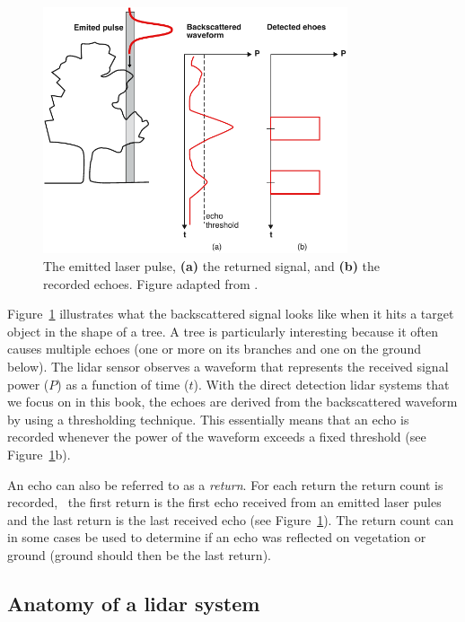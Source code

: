 \begin{figure}
	\centering
	\includegraphics[width=0.8\textwidth]{figs/lidar-multipulse.pdf}
	\caption{The emitted laser pulse, \textbf{(a)} the returned signal, and \textbf{(b)} the recorded echoes. Figure adapted from \citet{Bailly12}.}%
\label{fig:lidar-multipulse}
\end{figure}
Figure~\ref{fig:lidar-multipulse} illustrates what the backscattered signal looks like when it hits a target object in the shape of a tree. 
A tree is particularly interesting because it often causes multiple echoes (one or more on its branches and one on the ground below).  The lidar sensor observes a waveform that represents the received signal power ($P$) as a function of time ($t$). 
With the direct detection lidar systems that we focus on in this book, the echoes are derived from the backscattered waveform by using a thresholding technique. This essentially means that an echo is recorded whenever the power of the waveform exceeds a fixed threshold (see Figure~\ref{fig:lidar-multipulse}b). 

An echo can  also  be referred to as a \emph{return}. 
For each return the return count is recorded, \eg\ the first return is the first echo received from an emitted laser pules and the last return is the last received echo (see Figure~\ref{fig:lidar-multipulse}). The return count can in some cases be used to determine if an echo was reflected on vegetation or ground (ground should then be the last return).


\subsection{Anatomy of a lidar system}%
\label{lidar:anatomy}

